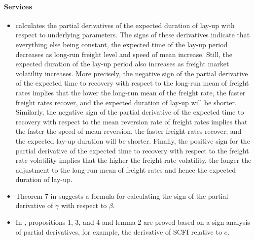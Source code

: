 \documentclass[11pt]{book}
\begin{document}
\paragraph{Services}
\begin{itemize}
\item \cite{alizadeh2017capacity}
calculates the partial derivatives of the expected duration of lay-up
with respect to underlying parameters. The signs of these derivatives
indicate that everything else being constant, the expected time of
the lay-up period decreases as long-run freight level and speed of
mean increase. Still, the expected duration of the lay-up period also
increases as freight market volatility increases. More precisely,
the negative sign of the partial derivative of the expected time to
recovery with respect to the long-run mean of freight rates implies
that the lower the long-run mean of the freight rate, the faster freight
rates recover, and the expected duration of lay-up will be shorter.
Similarly, the negative sign of the partial derivative of the expected
time to recovery with respect to the mean reversion rate of freight
rates implies that the faster the speed of mean reversion, the faster
freight rates recover, and the expected lay-up duration will be shorter.
Finally, the positive sign for the partial derivative of the expected
time to recovery with respect to the freight rate volatility implies
that the higher the freight rate volatility, the longer the adjustment
to the long-run mean of freight rates and hence the expected duration
of lay-up.
\item Theorem 7 in \cite{matsumoto2016stability}
suggests a formula for calculating the sign of the partial derivative
of $\gamma$ with respect to $\beta$.
\item In \cite{cornee2018theory}, propositions 1, 3, and
4 and lemma 2 are proved based on a sign analysis of partial derivatives,
for example, the derivative of SCFI relative to $e$.
\end{itemize}
\end{document}
